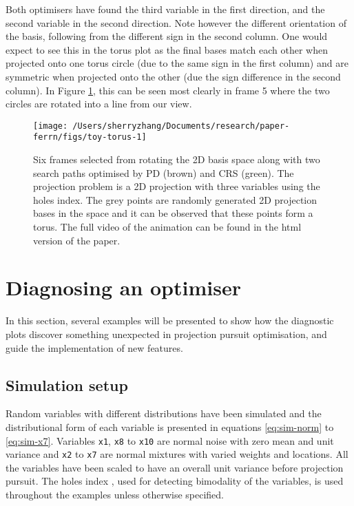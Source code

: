 Both optimisers have found the third variable in the first direction,
and the second variable in the second direction. Note however the
different orientation of the basis, following from the different sign in
the second column. One would expect to see this in the torus plot as the
final bases match each other when projected onto one torus circle (due
to the same sign in the first column) and are symmetric when projected
onto the other (due the sign difference in the second column). In Figure
\ref{fig:toy-torus}, this can be seen most clearly in frame 5 where the
two circles are rotated into a line from our view.

\begin{Schunk}
\begin{figure}

{\centering \texttt{[image: /Users/sherryzhang/Documents/research/paper-ferrn/figs/toy-torus-1]} 

}

\caption[Six frames selected from rotating the 2D basis space along with two search paths optimised by PD (brown) and CRS (green)]{Six frames selected from rotating the 2D basis space along with two search paths optimised by PD (brown) and CRS (green). The projection problem is a 2D projection with three variables using the holes index. The grey points are randomly generated 2D projection bases in the space and it can be observed that these points form a torus. The full video of the animation can be found in the html version of the paper.}\label{fig:toy-torus}
\end{figure}
\end{Schunk}

\hypertarget{application}{%
\section{Diagnosing an optimiser}\label{application}}

In this section, several examples will be presented to show how the
diagnostic plots discover something unexpected in projection pursuit
optimisation, and guide the implementation of new features.

\hypertarget{simulation-setup}{%
\subsection{Simulation setup}\label{simulation-setup}}

Random variables with different distributions have been simulated and
the distributional form of each variable is presented in equations
\ref{eq:sim-norm} to \ref{eq:sim-x7}. Variables \texttt{x1}, \texttt{x8}
to \texttt{x10} are normal noise with zero mean and unit variance and
\texttt{x2} to \texttt{x7} are normal mixtures with varied weights and
locations. All the variables have been scaled to have an overall unit
variance before projection pursuit. The holes index
\citep{cook2008grand}, used for detecting bimodality of the variables,
is used throughout the examples unless otherwise specified.

